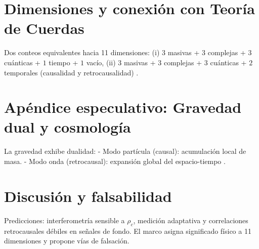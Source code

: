 \documentclass[reprint,amsmath,amssymb,aps]{revtex4-2}
\begin{document}
\section{Dimensiones y conexión con Teoría de Cuerdas}
Dos conteos equivalentes hacia 11 dimensiones:  
(i) $3$ masivas + $3$ complejas + $3$ cuánticas + $1$ tiempo + $1$ vacío,  
(ii) $3$ masivas + $3$ complejas + $3$ cuánticas + $2$ temporales (causalidad y retrocausalidad) \cite{Greene2000, Penrose2004}.

\section{Apéndice especulativo: Gravedad dual y cosmología}
La gravedad exhibe dualidad:  
- Modo partícula (causal): acumulación local de masa.  
- Modo onda (retrocausal): expansión global del espacio-tiempo \cite{Carroll2010}.  

\section{Discusión y falsabilidad}
Predicciones: interferometría sensible a $\rho_c$, medición adaptativa y correlaciones retrocausales débiles en señales de fondo. El marco asigna significado físico a 11 dimensiones y propone vías de falsación.



\end{document}
